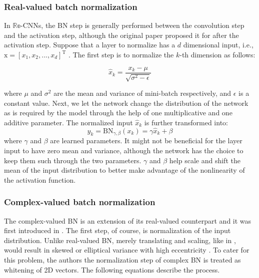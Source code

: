  \subsubsection{Real-valued batch normalization}\label{rvbn}
In $\mathbb{Re}$-CNNs, the BN step is generally performed between the convolution step and the activation step, although the original paper \cite{bnIoffeS15} proposed it for after the activation step. Suppose that a layer to normalize has a $d$ dimensional
input, i.e., $\mathrm{x} = [x_{1} , x_{2} , ..., x_{d} ]^{\mathrm{T}}$ .  The first step is to normalize the $k$-th dimension as follows:


 \begin{equation}
\hat{x}_{k} = \frac{x_{k} - \mu}{\sqrt{\sigma^{2} - \epsilon}}
\label{eqrbn1}
\end{equation}

where $\mu$ and $\sigma^{2}$ are the mean and variance of mini-batch respectively, and $\epsilon$ is a constant value. Next, we let the network change the distribution of the network as is required by the model through the help of one multiplicative and one additive parameter. The normalized input $\hat{x}_{k}$ is further transformed into:
 \begin{equation}
y_{k} = \mathrm{BN}_{\gamma,\beta}(x_{k}) = \gamma\hat{x}_{k} + \beta
\label{eqrbn2}
\end{equation}
where $\gamma$ and $\beta$ are learned parameters. It might not be beneficial for the layer input to have zero mean and variance, although the network has the choice to keep them such through the two parameters. $\gamma$ and $\beta$ help scale and shift the mean of the input distribution to better make advantage of the nonlinearity of the activation function.


 \subsubsection{Complex-valued batch normalization}
The complex-valued BN is an extension of its real-valued counterpart and it was first introduced in \cite{trabelsi2018deep}. The first step, of course, is normalization of the input distribution. Unlike real-valued BN, merely translating and scaling, like in \cite{bnIoffeS15}, would result in skewed or elliptical variance with high eccentricity \cite{trabelsi2018deep}. To cater for this problem, the authors the normalization step of complex BN is treated  as whitening of 2D vectors. The following equations describe the process.

